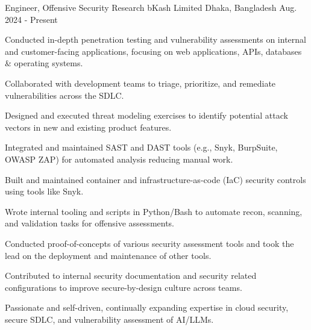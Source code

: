 

\begin{cventries}

  \cventry
    {Engineer, Offensive Security Research} %
    {bKash Limited} %
    {Dhaka, Bangladesh} %
    {Aug. 2024 - Present} %
    {
      \begin{cvitems} %
        \item Conducted in-depth penetration testing and vulnerability assessments on internal and customer-facing applications, focusing on web applications, APIs, databases \& operating systems.
        \item Collaborated with development teams to triage, prioritize, and remediate vulnerabilities across the SDLC.
        \item Designed and executed threat modeling exercises to identify potential attack vectors in new and existing product features.
        \item Integrated and maintained SAST and DAST tools (e.g., Snyk, BurpSuite, OWASP ZAP) for automated analysis reducing manual work.
        \item Built and maintained container and infrastructure-as-code (IaC) security controls using tools like Snyk.
        \item Wrote internal tooling and scripts in Python/Bash to automate recon, scanning, and validation tasks for offensive assessments.
        \item Conducted proof-of-concepts of various security assessment tools and took the lead on the  deployment and maintenance of other tools.
        \item Contributed to internal security documentation and security related configurations to improve secure-by-design culture across teams.
        \item Passionate and self-driven, continually expanding expertise in cloud security, secure SDLC, and vulnerability assessment of AI/LLMs.
      \end{cvitems}
    }

\end{cventries}
